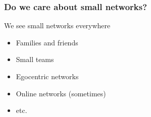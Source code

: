 \documentclass[aspectratio=169, 9pt]{beamer}\usepackage[]{graphicx}\usepackage[]{color}
\begin{document}
\begin{frame}[c]
\frametitle{Do we care about small networks?}

\begin{minipage}{.40\linewidth}
We see small networks everywhere\pause

\begin{itemize}[<+->]
\item Families and friends
\item Small teams
\item Egocentric networks
\item Online networks (sometimes)
\item etc.
\end{itemize}
\end{minipage}
\hfill
{}
\end{frame}

% 
% 
% 
\end{document}
